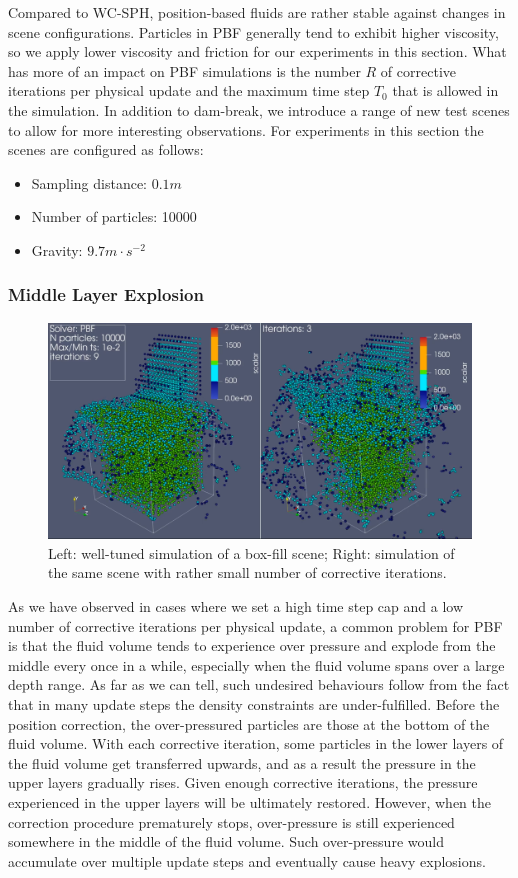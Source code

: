 \documentclass[
	11pt, 
	DIV10,
	ngerman,
	a4paper, 
	oneside, 
	headings=normal, 
	captions=tableheading,
	final, 
	numbers=noenddot
]{scrartcl}
\begin{document}
Compared to WC-SPH, position-based fluids are rather stable against changes in scene configurations. Particles in PBF generally tend to exhibit higher viscosity, so we apply lower viscosity and friction for our experiments in this section. What has more of an impact on PBF simulations is the number $ R $ of corrective iterations per physical update and the maximum time step $ T_{0} $ that is allowed in the simulation. In addition to dam-break, we introduce a range of new test scenes to allow for more interesting observations. For experiments in this section the scenes are configured as follows:

\begin{itemize}
    \item Sampling distance: $ 0.1m $
    \item Number of particles: 10000
    \item Gravity: $ 9.7m \cdot s^{-2} $
\end{itemize}

\subsubsection{Middle Layer Explosion}

\begin{figure}
    \centering
    \includegraphics[width=.6\textwidth]{pics/pbf_iter.png}
    \caption{Left: well-tuned simulation of a box-fill scene; Right: simulation of the same scene with rather small number of corrective iterations.}
    \label{fig:boxfill}
\end{figure}

As we have observed in cases where we set a high time step cap and a low number of corrective iterations per physical update, a common problem for PBF is that the fluid volume tends to experience over pressure and explode from the middle every once in a while, especially when the fluid volume spans over a large depth range. As far as we can tell, such undesired behaviours follow from the fact that in many update steps the density constraints are under-fulfilled. Before the position correction, the over-pressured particles are those at the bottom of the fluid volume. With each corrective iteration, some particles in the lower layers of the fluid volume get transferred upwards, and as a result the pressure in the upper layers gradually rises. Given enough corrective iterations, the pressure experienced in the upper layers will be ultimately restored. However, when the correction procedure prematurely stops, over-pressure is still experienced somewhere in the middle of the fluid volume. Such over-pressure would accumulate over multiple update steps and eventually cause heavy explosions.
\end{document}
